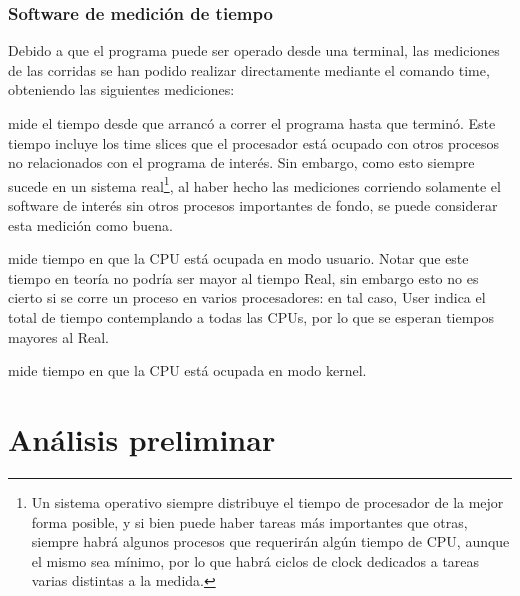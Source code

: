 \documentclass{article}
\begin{document}
\subsubsection{Software de medición de tiempo}
Debido a que el programa puede ser operado desde una terminal, las mediciones de las corridas se han podido realizar directamente mediante el comando time, obteniendo las siguientes mediciones: 
\begin{description}[align=left]
    \item [Real:] mide el tiempo desde que arrancó a correr el programa hasta que terminó. Este tiempo incluye los time slices que el procesador está ocupado con otros procesos no relacionados con el programa de interés. Sin embargo, como esto siempre sucede en un sistema real\footnote{ Un sistema operativo siempre distribuye el tiempo de procesador de la mejor forma posible, y si bien puede haber tareas más importantes que otras, siempre habrá algunos procesos que requerirán algún tiempo de CPU, aunque el mismo sea mínimo, por lo que habrá ciclos de clock dedicados a tareas varias distintas a la medida.}, al haber hecho las mediciones corriendo solamente el software de interés sin otros procesos importantes de fondo, se puede considerar esta medición como buena.
    \item [User:] mide tiempo en que la CPU está ocupada en modo usuario. Notar que este tiempo en teoría no podría ser mayor al tiempo Real, sin embargo esto no es cierto si se corre un proceso en varios procesadores: en tal caso, User indica el total de tiempo contemplando a todas las CPUs, por lo que se esperan tiempos mayores al Real.
    \item [Sys:] mide tiempo en que la CPU está ocupada en modo kernel.
\end{description}

\newpage
\section{Análisis preliminar}
\end{document}
